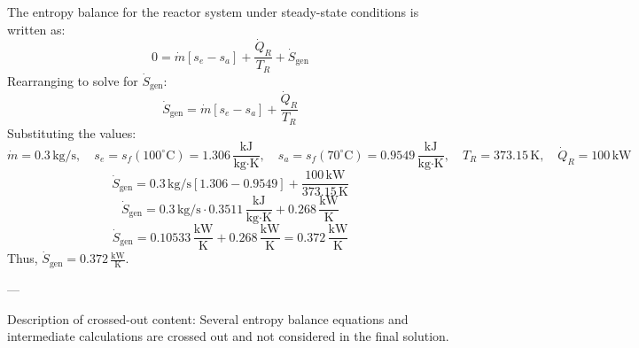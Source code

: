The entropy balance for the reactor system under steady-state conditions is written as:  
\[
0 = \dot{m} \left[ s_e - s_a \right] + \frac{\dot{Q}_R}{T_R} + \dot{S}_{\text{gen}}
\]  
Rearranging to solve for \( \dot{S}_{\text{gen}} \):  
\[
\dot{S}_{\text{gen}} = \dot{m} \left[ s_e - s_a \right] + \frac{\dot{Q}_R}{T_R}
\]  
Substituting the values:  
\[
\dot{m} = 0.3 \, \text{kg/s}, \quad s_e = s_f(100^\circ\text{C}) = 1.306 \, \frac{\text{kJ}}{\text{kg·K}}, \quad s_a = s_f(70^\circ\text{C}) = 0.9549 \, \frac{\text{kJ}}{\text{kg·K}}, \quad T_R = 373.15 \, \text{K}, \quad \dot{Q}_R = 100 \, \text{kW}
\]  
\[
\dot{S}_{\text{gen}} = 0.3 \, \text{kg/s} \left[ 1.306 - 0.9549 \right] + \frac{100 \, \text{kW}}{373.15 \, \text{K}}
\]  
\[
\dot{S}_{\text{gen}} = 0.3 \, \text{kg/s} \cdot 0.3511 \, \frac{\text{kJ}}{\text{kg·K}} + 0.268 \, \frac{\text{kW}}{\text{K}}
\]  
\[
\dot{S}_{\text{gen}} = 0.10533 \, \frac{\text{kW}}{\text{K}} + 0.268 \, \frac{\text{kW}}{\text{K}} = 0.372 \, \frac{\text{kW}}{\text{K}}
\]  
Thus, \( \dot{S}_{\text{gen}} = 0.372 \, \frac{\text{kW}}{\text{K}} \).  

---

Description of crossed-out content: Several entropy balance equations and intermediate calculations are crossed out and not considered in the final solution.